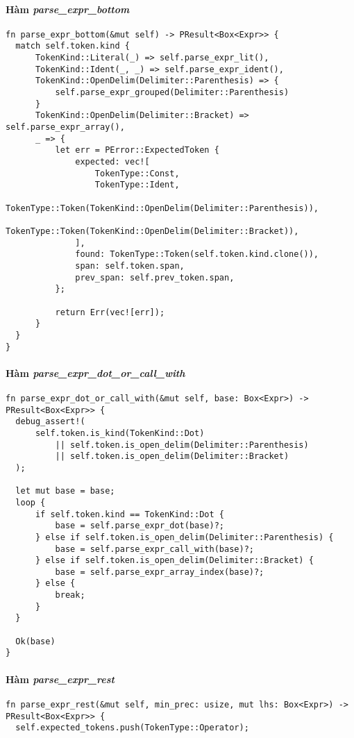 {\paragraph{Hàm \textit{parse\_expr\_bottom}}
\label{ap1:expr_bottom}
\begin{lstlisting}
fn parse_expr_bottom(&mut self) -> PResult<Box<Expr>> {
  match self.token.kind {
      TokenKind::Literal(_) => self.parse_expr_lit(),
      TokenKind::Ident(_, _) => self.parse_expr_ident(),
      TokenKind::OpenDelim(Delimiter::Parenthesis) => {
          self.parse_expr_grouped(Delimiter::Parenthesis)
      }
      TokenKind::OpenDelim(Delimiter::Bracket) => self.parse_expr_array(),
      _ => {
          let err = PError::ExpectedToken {
              expected: vec![
                  TokenType::Const,
                  TokenType::Ident,
                  TokenType::Token(TokenKind::OpenDelim(Delimiter::Parenthesis)),
                  TokenType::Token(TokenKind::OpenDelim(Delimiter::Bracket)),
              ],
              found: TokenType::Token(self.token.kind.clone()),
              span: self.token.span,
              prev_span: self.prev_token.span,
          };

          return Err(vec![err]);
      }
  }
}
\end{lstlisting}

\paragraph{Hàm \textit{parse\_expr\_dot\_or\_call\_with}}
\label{ap1:expr_dot_or_call_with}
\begin{lstlisting}
fn parse_expr_dot_or_call_with(&mut self, base: Box<Expr>) -> PResult<Box<Expr>> {
  debug_assert!(
      self.token.is_kind(TokenKind::Dot)
          || self.token.is_open_delim(Delimiter::Parenthesis)
          || self.token.is_open_delim(Delimiter::Bracket)
  );

  let mut base = base;
  loop {
      if self.token.kind == TokenKind::Dot {
          base = self.parse_expr_dot(base)?;
      } else if self.token.is_open_delim(Delimiter::Parenthesis) {
          base = self.parse_expr_call_with(base)?;
      } else if self.token.is_open_delim(Delimiter::Bracket) {
          base = self.parse_expr_array_index(base)?;
      } else {
          break;
      }
  }

  Ok(base)
}
\end{lstlisting}

\paragraph{Hàm \textit{parse\_expr\_rest}}
\label{ap1:expr_rest}
\begin{lstlisting}
fn parse_expr_rest(&mut self, min_prec: usize, mut lhs: Box<Expr>) -> PResult<Box<Expr>> {
  self.expected_tokens.push(TokenType::Operator);


\end{lstlisting}}
